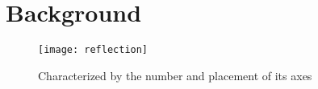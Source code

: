 \section{Background}
\begin{figure}
\centering
\texttt{[image: reflection]}
\caption{Characterized by the number and placement of its axes}
\label{ref}
\end{figure}